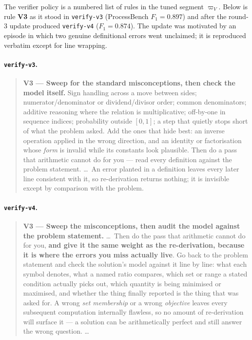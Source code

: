 \documentclass{article} %
\begin{document}
The verifier policy is a numbered list of rules in the tuned segment $\varpi_V$. Below is
rule \textbf{V3} as it stood in \texttt{verify-v3} (ProcessBench $F_1 = 0.897$) and after the
round-3 update produced \texttt{verify-v4} ($F_1 = 0.874$). The update was motivated by an
episode in which two genuine definitional errors went unclaimed; it is reproduced verbatim
except for line wrapping.

\paragraph{\texttt{verify-v3}.}
\begin{quote}\small
\textbf{V3 --- Sweep for the standard misconceptions, then check the model itself.} Sign
handling across a move between sides; numerator/denominator or dividend/divisor order; common
denominators; additive reasoning where the relation is multiplicative; off-by-one in sequence
indices; probability outside $[0,1]$; a step that quietly stops short of what the problem
asked. Add the ones that hide best: an inverse operation applied in the wrong direction, and
an identity or factorisation whose \emph{form} is invalid while its constants look plausible.
Then do a pass that arithmetic cannot do for you --- read every definition against the
problem statement. \ldots\ An error planted in a definition leaves every later line
consistent with it, so re-derivation returns nothing; it is invisible except by comparison
with the problem.
\end{quote}

\paragraph{\texttt{verify-v4}.}
\begin{quote}\small
\textbf{V3 --- Sweep the misconceptions, then audit the model against the problem statement.}
\ldots\ Then do the pass that arithmetic cannot do for you, \textbf{and give it the same
weight as the re-derivation, because it is where the errors you miss actually live}. Go back
to the problem statement and check the solution's model against it line by line: what each
symbol denotes, what a named ratio compares, which set or range a stated condition actually
picks out, which quantity is being minimised or maximised, and whether the thing finally
reported is the thing that was asked for. A wrong \emph{set membership} or a wrong
\emph{objective} leaves every subsequent computation internally flawless, so no amount of
re-derivation will surface it --- a solution can be arithmetically perfect and still answer
the wrong question. \ldots
\end{quote}
\end{document}
